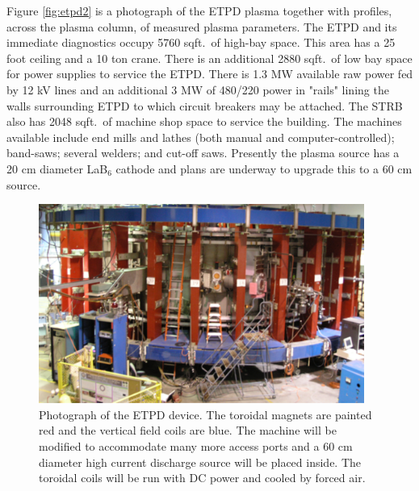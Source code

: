 \documentclass[11pt]{article}
\begin{document}
Figure \ref{fig:etpd2} is a photograph of the ETPD plasma together with profiles, across the plasma column, of measured plasma parameters.  The ETPD and its immediate diagnostics occupy 5760 sqft.\ of high-bay space.  This area has a 25 foot ceiling and a 10 ton crane.  There is an additional 2880 sqft.\ of low bay space for power supplies to service the ETPD.  There is 1.3 MW available raw power fed by 12 kV lines and an additional 3 MW of 480/220 power in "rails" lining the walls surrounding ETPD to which circuit breakers may be attached.  The STRB also has 2048 sqft.\ of machine shop space to service the building.  The machines available include end mills and lathes (both manual and computer-controlled); band-saws; several welders; and cut-off saws.  Presently the plasma source has a 20 cm diameter LaB$_{6}$ cathode and plans are underway to upgrade this to a 60 cm source.
\begin{figure}[h] %
   \centering
   \includegraphics[width=0.95\textwidth]{ETPD.jpg} 
   \caption{Photograph of the ETPD device.  The toroidal magnets are painted red and the vertical field coils are blue. The machine will be modified to accommodate many more access ports and a 60 cm diameter high current discharge source will be placed inside.  The toroidal coils will be run with DC power and cooled by forced air.}
   \label{fig:etpd}
\end{figure}
\end{document}
